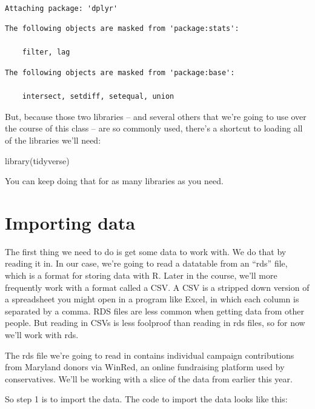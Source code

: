 \documentclass[
  letterpaper,
  DIV=11,
  numbers=noendperiod]{scrreprt}
\newenvironment{Shaded}{\begin{snugshade}}{\end{snugshade}}
\newcommand{\FunctionTok}[1]{\textcolor[rgb]{0.28,0.35,0.67}{#1}}
\newcommand{\NormalTok}[1]{\textcolor[rgb]{0.00,0.23,0.31}{#1}}
\begin{document}
\begin{verbatim}

Attaching package: 'dplyr'
\end{verbatim}

\begin{verbatim}
The following objects are masked from 'package:stats':

    filter, lag
\end{verbatim}

\begin{verbatim}
The following objects are masked from 'package:base':

    intersect, setdiff, setequal, union
\end{verbatim}

But, because those two libraries -- and several others that we're going
to use over the course of this class -- are so commonly used, there's a
shortcut to loading all of the libraries we'll need:

\begin{Shaded}
\begin{Highlighting}[]
\FunctionTok{library}\NormalTok{(tidyverse)}
\end{Highlighting}
\end{Shaded}

You can keep doing that for as many libraries as you need.

\hypertarget{importing-data}{%
\section{Importing data}\label{importing-data}}

The first thing we need to do is get some data to work with. We do that
by reading it in. In our case, we're going to read a datatable from an
``rds'' file, which is a format for storing data with R. Later in the
course, we'll more frequently work with a format called a CSV. A CSV is
a stripped down version of a spreadsheet you might open in a program
like Excel, in which each column is separated by a comma. RDS files are
less common when getting data from other people. But reading in CSVs is
less foolproof than reading in rds files, so for now we'll work with
rds.

The rds file we're going to read in contains individual campaign
contributions from Maryland donors via WinRed, an online fundraising
platform used by conservatives. We'll be working with a slice of the
data from earlier this year.

So step 1 is to import the data. The code to import the data looks like
this:
\end{document}
